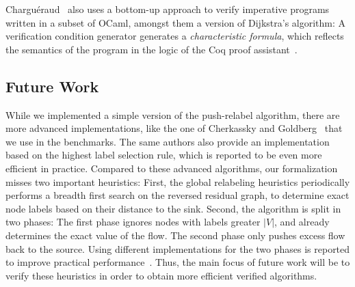 \documentclass[smallcondensed]{svjour3}     %
\begin{document}
  Chargu\'eraud~\cite{char11} also uses a bottom-up approach to verify imperative programs written in a subset of OCaml, amongst them a version of Dijkstra's algorithm:
  A verification condition generator generates a \emph{characteristic formula}, which reflects the semantics of the program in the logic of the Coq proof assistant~\cite{BeCa10}.
  
  \subsection{Future Work}
  While we implemented a simple version of the push-relabel algorithm, there are more advanced implementations, like the one of Cherkassky and Goldberg~\cite{ChGo97} that 
  we use in the benchmarks. The same authors also provide an implementation based on the highest label selection rule, which is reported to be even more efficient 
  in practice. 
  Compared to these advanced algorithms, our formalization misses two important heuristics: First, the global relabeling heuristics periodically performs a breadth first search on the reversed residual graph, to determine exact node labels based on their distance to the sink. Second, the algorithm is split in two phases: 
  The first phase ignores nodes with labels greater $|V|$, and already determines the exact value of the flow. The second phase only pushes excess flow back to the source. 
  Using different implementations for the two phases is reported to improve practical performance~\cite{ChGo97}. 
  Thus, the main focus of future work will be to verify these heuristics in order to obtain more efficient verified algorithms.
  
\end{document}
